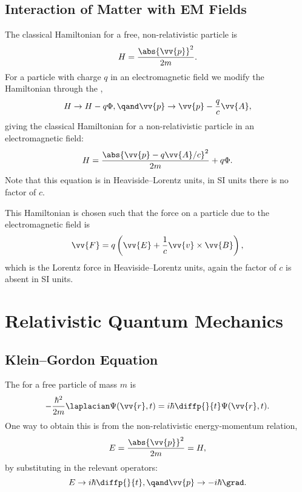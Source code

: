 \subsection{Interaction of Matter with EM Fields}
The classical Hamiltonian for a free, non-relativistic particle is
\begin{equation}
    H = \frac{\abs{\vv{p}}^2}{2m}.
\end{equation}
For a particle with charge \(q\) in an electromagnetic field we modify the Hamiltonian through the ,
\begin{equation}
    H \to H - q\Phi, \qand \vv{p} \to \vv{p} - \frac{q}{c}\vv{A},
\end{equation}
giving the classical Hamiltonian for a non-relativistic particle in an electromagnetic field:
\begin{equation}
    H = \frac{\abs{\vv{p} - q\vv{A}/c}^2}{2m} + q\Phi.
\end{equation}
Note that this equation is in Heaviside--Lorentz units, in SI units there is no factor of \(c\).

This Hamiltonian is chosen such that the force on a particle due to the electromagnetic field is
\begin{equation}
    \vv{F} = q\left( \vv{E} + \frac{1}{c}\vv{v} \times \vv{B} \right),
\end{equation}
which is the Lorentz force in Heaviside--Lorentz units, again the factor of \(c\) is absent in SI units.

\section{Relativistic Quantum Mechanics}
\subsection{Klein--Gordon Equation}
The  for a free particle of mass \(m\) is
\begin{equation}
    -\frac{\hbar^2}{2m} \laplacian \Psi(\vv{r}, t) = i\hbar\diffp{}{t}\Psi(\vv{r}, t).
\end{equation}
One way to obtain this is from the non-relativistic energy-momentum relation,
\begin{equation}
    E = \frac{\abs{\vv{p}}^2}{2m} = H,
\end{equation}
by substituting in the relevant operators:
\begin{equation}
    E \to i\hbar\diffp{}{t}, \qand \vv{p} \to -i\hbar\grad.
\end{equation}

